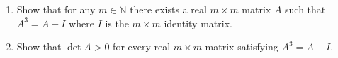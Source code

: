 \documentclass{article}
\begin{document}
	\setlength{\parindent}{0pt}
	\begin{enumerate}[label=\alph*)]
		\item 	Show that for any $m\in\mathbb{N}$ there exists a real $m\times m$ matrix $A$ such that $A^3=A+I$ where $I$ is the $m\times m$ identity matrix.
		\item Show that $\det A>0$ for every real $m\times m$ matrix satisfying $A^3=A+I$.
	\end{enumerate}
\end{document}
